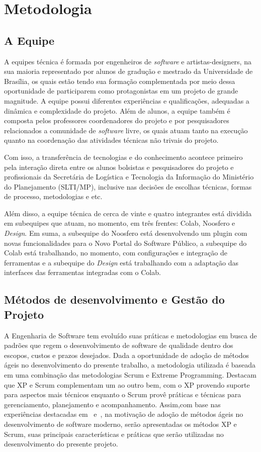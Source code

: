 \section{Metodologia}
\label{sec:metodologia}

\subsection{A Equipe}
\label{sec:equipe}

A equipes técnica é formada por engenheiros de \textit{software} e artistas-designers, na sua maioria representado por alunos de gradução e mestrado da Universidade de Brasília, os quais estão tendo sua formação complementada por meio dessa oportunidade de participarem como protagonistas em um projeto de grande magnitude.
A equipe possui diferentes experiências e qualificações, adequadas a dinâmica e complexidade do projeto. Além de alunos, a equipe também é composta pelos professores coordenadores do projeto e por pesquisadores relacionados a comunidade de \textit{software} livre, os quais atuam tanto na execução quanto na coordenação das 
atividades técnicas não trivais do projeto.

Com isso, a transferência de tecnologias e do conhecimento acontece primeiro pela interação direta entre
os alunos bolsistas e pesquisadores do projeto e profissionais da Secretária de Logística e Tecnologia da Informação do Ministério do Planejamento (SLTI/MP), inclusive nas decisões de escolhas
técnicas, formas de processo, metodologias e etc. 

Além disso, a equipe técnica de cerca de vinte e quatro integrantes está dividida em subequipes que atuam, no momento, em três frentes: Colab, Noosfero e \textit{Design}. Em suma, a subequipe do Noosfero está desenvolvendo um plugin com novas funcionalidades para o Novo Portal do Software Público, a subequipe do Colab está trabalhando, no momento, com configurações e integração de ferramentas e a 
subequipe do \textit{Design} está trabalhando com a adaptação das interfaces das ferramentas integradas com o Colab.


\subsection{Métodos de desenvolvimento e Gestão do Projeto}
\label{sec:metodo-gestao}

A Engenharia de Software tem evoluído suas práticas e metodologias em busca de padrões que regem o desenvolvimento de software de qualidade dentro dos escopos, custos e prazos desejados. 
%
Dada a oportunidade de adoção de métodos ágeis no desenvolvimento do presente trabalho, a 
metodologia utilizada é baseada em uma combinação das metodologias Scrum e Extreme Programming. Destacam que XP e Scrum complementam um ao outro bem, com o XP provendo suporte para aspectos mais técnicos enquanto o Scrum provê práticas e técnicas para gerenciamento, planejamento e acompanhamento. Assim,com base nas experiências destacadas em~\cite{schwaber2001} e~\cite{fitzgerald2006}, na motivação de adoção de métodos ágeis no desenvolvimento de software moderno, serão apresentadas os métodos XP e Scrum, suas principais características e práticas que serão utilizadas no desenvolvimento do presente projeto.


